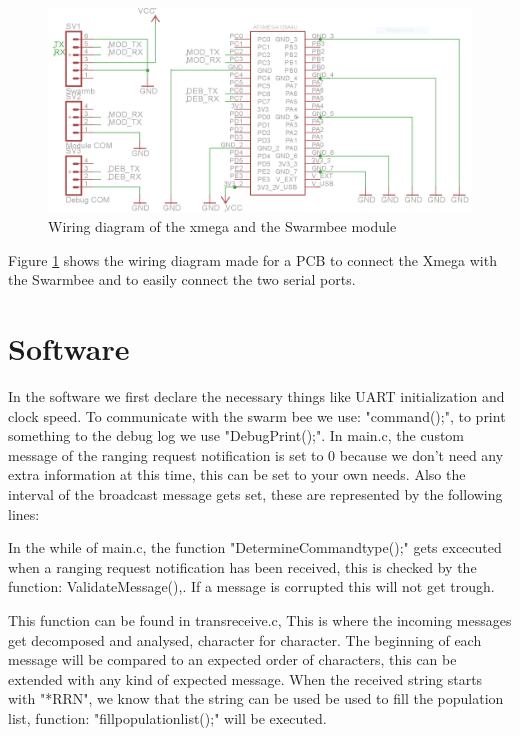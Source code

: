 \documentclass[a4paper, 10pt]{article} %
\begin{document}
\begin{figure}[H]
  \centering
      \includegraphics[width=\textwidth]{schema.png}
  \caption{Wiring diagram of the xmega and the Swarmbee module}
  \label{schema}
\end{figure}

Figure \ref{schema} shows the wiring diagram made for a PCB to connect the Xmega with the Swarmbee and to easily connect the two serial ports.


\section*{Software}
In the software we first declare the necessary things like UART initialization and clock speed. To communicate with the swarm bee we use: "command();", to print something to the debug log we use "DebugPrint();". In main.c, the custom message of the ranging request notification is set to 0 because we don't need any extra information at this time, this can be set to your own needs. Also the interval of the broadcast message gets set, these are represented by the following lines:


In the while of main.c, the function "DetermineCommandtype();" gets excecuted when a ranging request notification has been received, this is checked by the function: ValidateMessage(),. If a message is corrupted this will not get trough.


This function can be found in transreceive.c, This is where the incoming messages get decomposed and analysed, character for character. The beginning of each message will be compared to an expected order of characters, this can be extended with any kind of expected message. When the received string starts with "*RRN", we know that the string can be used be used to fill the population list, function: "fillpopulationlist();" will be executed.

\end{document}
